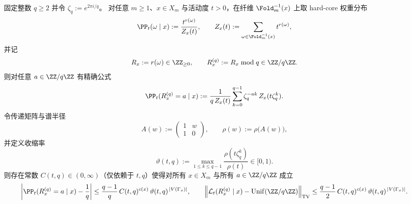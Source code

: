 \begin{theorem}[任意活动度下的根单位滤波与指数级均匀化]\label{thm:pom-fiber-rewrite-root-of-unity-filter-modq-exp-uniformization}
固定整数 \(q\ge 2\) 并令 \(\zeta_q:=e^{2\pi i/q}\)。
对任意 \(m\ge 1\)、\(x\in X_m\) 与活动度 \(t>0\)，在纤维 \(\Fold_m^{-1}(x)\) 上取 hard-core 权重分布
\[
\PP_t(\omega\mid x):=\frac{t^{r(\omega)}}{Z_x(t)},
\qquad
Z_x(t):=\sum_{\omega\in\Fold_m^{-1}(x)} t^{r(\omega)},
\]
并记
\[
R_x:=r(\omega)\in\ZZ_{\ge 0},
\qquad
R_x^{(q)}:=R_x\bmod q\in \ZZ/q\ZZ.
\]
则对任意 \(a\in\ZZ/q\ZZ\) 有精确公式
\[
\PP_t(R_x^{(q)}=a\mid x)
:=\frac{1}{q\,Z_x(t)}\sum_{k=0}^{q-1}\zeta_q^{-ak}\,Z_x(t\zeta_q^{k}).
\]
令传递矩阵与谱半径
\[
A(w):=
\begin{pmatrix}
1 & w\\
1 & 0
\end{pmatrix},
\qquad
\rho(w):=\rho\bigl(A(w)\bigr),
\]
并定义收缩率
\[
\vartheta(t,q):=\max_{1\le k\le q-1}\frac{\rho(t\zeta_q^k)}{\rho(t)}\in[0,1).
\]
则存在常数 \(C(t,q)\in(0,\infty)\)（仅依赖于 \(t,q\)）使得对所有 \(x\in X_m\) 与所有 \(a\in\ZZ/q\ZZ\) 成立
\[
\left|\PP_t(R_x^{(q)}=a\mid x)-\frac{1}{q}\right|
\le \frac{q-1}{q}\,C(t,q)^{c(x)}\,\vartheta(t,q)^{\,|V(\Gamma_x)|},
\qquad
\left\|\mathcal L_t(R_x^{(q)}\mid x)-\mathrm{Unif}(\ZZ/q\ZZ)\right\|_{\mathrm{TV}}
\le \frac{q-1}{2}\,C(t,q)^{c(x)}\,\vartheta(t,q)^{\,|V(\Gamma_x)|}.
\]
\end{theorem}

